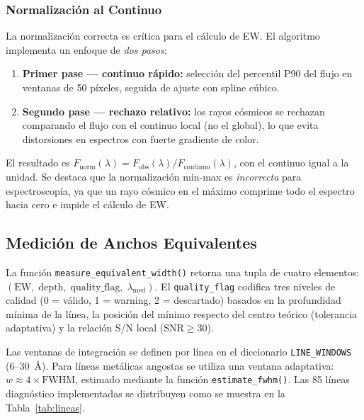 \documentclass[12pt,a4paper]{article}
\begin{document}
\subsubsection{Normalización al Continuo}

La normalización correcta es crítica para el cálculo de EW. El algoritmo implementa un
enfoque de \emph{dos pasos}:
\begin{enumerate}
  \item \textbf{Primer pase — continuo rápido:} selección del percentil P90 del flujo
        en ventanas de 50 píxeles, seguida de ajuste con spline cúbico.
  \item \textbf{Segundo pase — rechazo relativo:} los rayos cósmicos se rechazan
        comparando el flujo con el continuo local (no el global), lo que evita
        distorsiones en espectros con fuerte gradiente de color.
\end{enumerate}
El resultado es $F_\mathrm{norm}(\lambda) = F_\mathrm{obs}(\lambda) /
F_\mathrm{continuo}(\lambda)$, con el continuo igual a la unidad.
Se destaca que la normalización min-max es \emph{incorrecta} para espectroscopía, ya
que un rayo cósmico en el máximo comprime todo el espectro hacia cero e impide el
cálculo de EW.

\subsection{Medición de Anchos Equivalentes}

La función \texttt{measure\_equivalent\_width()} retorna una tupla de cuatro elementos:
$(\mathrm{EW},\;\mathrm{depth},\;\mathrm{quality\_flag},\;\lambda_\mathrm{med})$.
El \texttt{quality\_flag} codifica tres niveles de calidad (0 = válido, 1 = warning,
2 = descartado) basados en la profundidad mínima de la línea, la posición del mínimo
respecto del centro teórico (tolerancia adaptativa) y la relación S/N local
($\mathrm{SNR} \geq 30$).

Las ventanas de integración se definen por línea en el diccionario \texttt{LINE\_WINDOWS}
(6--30~Å). Para líneas metálicas angostas se utiliza una ventana adaptativa:
$w \approx 4 \times \mathrm{FWHM}$, estimado mediante la función \texttt{estimate\_fwhm()}.
Las 85 líneas diagnóstico implementadas se distribuyen como se muestra en la
Tabla~\ref{tab:lineas}.
\end{document}
